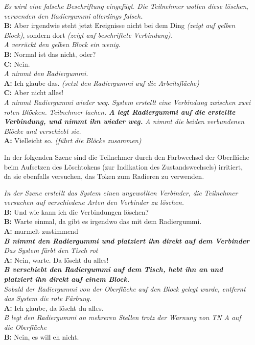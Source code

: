 \begin{transkript}
	\emph{Es wird eine falsche Beschriftung eingefügt. Die Teilnehmer wollen diese löschen, verwenden den Radiergummi allerdings falsch.}\\
	\textbf{B:} Aber irgendwie steht jetzt Ereignisse nicht bei dem Ding \emph{(zeigt auf gelben Block)}, sondern dort \emph{(zeigt auf beschriftete Verbindung)}.\\
	\emph{A verrückt den gelben Block ein wenig.}\\
	\textbf{B:} Normal ist das nicht, oder?\\
	\textbf{C:} Nein.\\
	\emph{A nimmt den Radiergummi.}\\
	\textbf{A:} Ich glaube das. \emph{(setzt den Radiergummi auf die Arbeitsfläche)}\\
	\textbf{C:} Aber nicht alles!\\
	\emph{A nimmt Radiergummi wieder weg. System erstellt eine Verbindung zwischen zwei roten Blöcken. Teilnehmer lachen. \textbf{A legt Radiergummi auf die erstellte Verbindung, und nimmt ihn wieder weg.} A nimmt die beiden verbundenen Blöcke und verschiebt sie.}\\
	\textbf{A:} Vielleicht so. \emph{(führt die Blöcke zusammen)}
\end{transkript}

In der folgenden Szene sind die Teilnehmer durch den Farbwechsel der Oberfläche beim Aufsetzen des Löschtokens (zur Indikation des Zustandswechsels) irritiert, da sie ebenfalls versuchen, das Token zum Radieren zu verwenden.

\begin{transkript}
	\emph{In der Szene erstellt das System einen ungewollten Verbinder, die Teilnehmer versuchen auf verschiedene Arten den Verbinder zu löschen.}\\
	\textbf{B:} Und wie kann ich die Verbindungen löschen?\\
	\textbf{B:} Warte einmal, da gibt es irgendwo das mit dem Radiergummi.\\
	\textbf{A:} murmelt zustimmend \\
	\emph{\textbf{B nimmt den Radiergummi und platziert ihn direkt auf dem Verbinder}}\\
	\emph{Das System färbt den Tisch rot}\\
	\textbf{A:} Nein, warte. Da löscht du alles!\\
	\emph{\textbf{B verschiebt den Radiergummi auf dem Tisch, hebt ihn an und platziert ihn direkt auf einem Block.}}\\
	\emph{Sobald der Radiergummi von der Oberfläche auf den Block gelegt wurde, entfernt das System die rote Färbung.}\\
	\textbf{A:} Ich glaube, da löscht du alles.\\
	\emph{B legt den Radiergummi an mehreren Stellen trotz der Warnung von TN A auf die Oberfläche}\\
	\textbf{B:} Nein, es will eh nicht.\\
\end{transkript}

